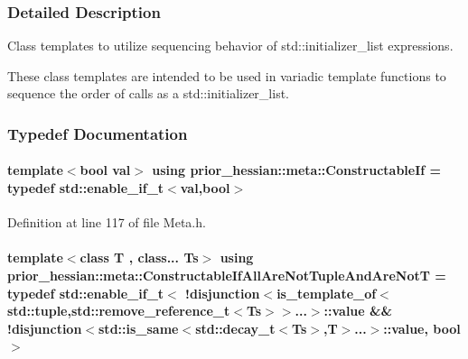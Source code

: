 \subsubsection{Detailed Description}
Class templates to utilize sequencing behavior of std\+::initializer\+\_\+list expressions. 

These class templates are intended to be used in variadic template functions to sequence the order of calls as a std\+::initializer\+\_\+list. 

\subsubsection{Typedef Documentation}
\paragraph[{\texorpdfstring{Constructable\+If}{ConstructableIf}}]{\setlength{\rightskip}{0pt plus 5cm}template$<$bool val$>$ using {\bf prior\+\_\+hessian\+::meta\+::\+Constructable\+If} = typedef std\+::enable\+\_\+if\+\_\+t$<$val,bool$>$}\hypertarget{namespaceprior__hessian_1_1meta_aa8f9847c6c56ca1f8530657d74bb9a99}{}\label{namespaceprior__hessian_1_1meta_aa8f9847c6c56ca1f8530657d74bb9a99}


Definition at line 117 of file Meta.\+h.

\paragraph[{\texorpdfstring{Constructable\+If\+All\+Are\+Not\+Tuple\+And\+Are\+NotT}{ConstructableIfAllAreNotTupleAndAreNotT}}]{\setlength{\rightskip}{0pt plus 5cm}template$<$class T , class... Ts$>$ using {\bf prior\+\_\+hessian\+::meta\+::\+Constructable\+If\+All\+Are\+Not\+Tuple\+And\+Are\+NotT} = typedef std\+::enable\+\_\+if\+\_\+t$<$ !{\bf disjunction}$<${\bf is\+\_\+template\+\_\+of}$<$std\+::tuple,std\+::remove\+\_\+reference\+\_\+t$<$Ts$>$$>$...$>$\+::value \&\& !{\bf disjunction}$<$std\+::is\+\_\+same$<$std\+::decay\+\_\+t$<$Ts$>$,T$>$...$>$\+::value, bool$>$}\hypertarget{namespaceprior__hessian_1_1meta_a5eaabc649c9629ae8f49d45c3141c4b5}{}\label{namespaceprior__hessian_1_1meta_a5eaabc649c9629ae8f49d45c3141c4b5}


